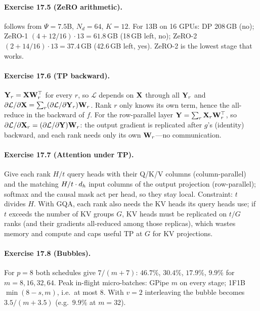 \paragraph{Exercise 17.5 (ZeRO arithmetic).}
 follows from $\Psi=7.5$B, $N_d=64$, $K=12$. For 13B on 16 GPUs: DP 208\,GB
(no); ZeRO-1 $(4+12/16)\cdot13=61.8$\,GB (18\,GB left, no); ZeRO-2 $(2+14/16)\cdot13=37.4$\,GB
(42.6\,GB left, yes). ZeRO-2 is the lowest stage that works.

\paragraph{Exercise 17.6 (TP backward).}
$\mathbf{Y}_r=\mathbf{X}\mathbf{W}_r^\top$ for every $r$, so $\mathcal L$ depends on $\mathbf{X}$ through all
$\mathbf{Y}_r$ and $\partial\mathcal L/\partial\mathbf{X}=\sum_r(\partial\mathcal L/\partial\mathbf{Y}_r)\mathbf{W}_r$.
Rank $r$ only knows its own term, hence the all-reduce in the backward of $f$. For the row-parallel
layer $\mathbf{Y}=\sum_r\mathbf{X}_r\mathbf{W}_r^\top$, so $\partial\mathcal L/\partial\mathbf{X}_r=
(\partial\mathcal L/\partial\mathbf{Y})\mathbf{W}_r$: the output gradient is replicated after $g$'s
(identity) backward, and each rank needs only its own $\mathbf{W}_r$---no communication.

\paragraph{Exercise 17.7 (Attention under TP).}
Give each rank $H/t$ query heads with their Q/K/V columns (column-parallel) and the matching
$H/t\cdot d_{h}$ input columns of the output projection (row-parallel); softmax and the causal mask
act per head, so they stay local. Constraint: $t$ divides $H$. With GQA, each rank also needs the KV
heads its query heads use; if $t$ exceeds the number of KV groups $G$, KV heads must be replicated
on $t/G$ ranks (and their gradients all-reduced among those replicas), which wastes memory and
compute and caps useful TP at $G$ for KV projections.

\paragraph{Exercise 17.8 (Bubbles).}
For $p=8$ both schedules give $7/(m+7)$: $46.7\%$, $30.4\%$, $17.9\%$, $9.9\%$ for
$m=8,16,32,64$. Peak in-flight micro-batches: GPipe $m$ on every stage; 1F1B $\min(8-s,m)$, i.e.\
at most 8. With $v=2$ interleaving the bubble becomes $3.5/(m+3.5)$ (e.g.\ $9.9\%$ at $m=32$).

